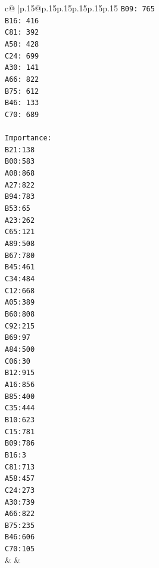 \documentclass{article}
\begin{document}
{\begin{supertabular}{c@{$\;$}|p{.15\linewidth}@{}p{.15\linewidth}p{.15\linewidth}p{.15\linewidth}p{.15\linewidth}p{.15\linewidth}}
{{{\texttt{B09: 765} \\
\texttt{B16: 416} \\
\texttt{C81: 392} \\
\texttt{A58: 428} \\
\texttt{C24: 699} \\
\texttt{A30: 141} \\
\texttt{A66: 822} \\
\texttt{B75: 612} \\
\texttt{B46: 133} \\
\texttt{C70: 689} \\
\\ 
\texttt{Importance:} \\
\texttt{B21:138} \\
\texttt{B00:583} \\
\texttt{A08:868} \\
\texttt{A27:822} \\
\texttt{B94:783} \\
\texttt{B53:65} \\
\texttt{A23:262} \\
\texttt{C65:121} \\
\texttt{A89:508} \\
\texttt{B67:780} \\
\texttt{B45:461} \\
\texttt{C34:484} \\
\texttt{C12:668} \\
\texttt{A05:389} \\
\texttt{B60:808} \\
\texttt{C92:215} \\
\texttt{B69:97} \\
\texttt{A84:500} \\
\texttt{C06:30} \\
\texttt{B12:915} \\
\texttt{A16:856} \\
\texttt{B85:400} \\
\texttt{C35:444} \\
\texttt{B10:623} \\
\texttt{C15:781} \\
\texttt{B09:786} \\
\texttt{B16:3} \\
\texttt{C81:713} \\
\texttt{A58:457} \\
\texttt{C24:273} \\
\texttt{A30:739} \\
\texttt{A66:822} \\
\texttt{B75:235} \\
\texttt{B46:606} \\
\texttt{C70:105} \\
            }
        }
    }
    & & \\ \\


\end{supertabular}}
\end{document}
